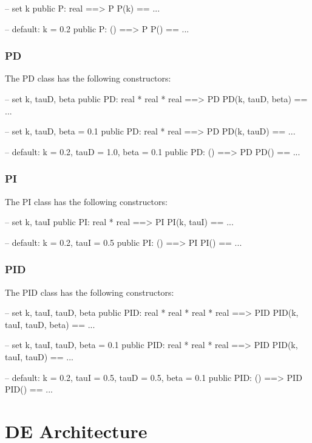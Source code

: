 \documentclass{crescendorepchap}
\begin{document}
\begin{vdmrt}
-- set k
public P: real ==> P
P(k) == ...

-- default: k = 0.2
public P: () ==> P
P() == ...
\end{vdmrt}

\subsubsection{PD}

The PD class has the following constructors:

\begin{vdmrt}
-- set k, tauD, beta
public PD: real * real * real ==> PD
PD(k, tauD, beta) == ...

-- set k, tauD, beta = 0.1
public PD: real * real ==> PD
PD(k, tauD) == ...

-- default: k = 0.2, tauD = 1.0, beta = 0.1
public PD: () ==> PD
PD() == ...
\end{vdmrt}

\subsubsection{PI}

The PI class has the following constructors:

\begin{vdmrt}
-- set k, tauI
public PI: real * real ==> PI
PI(k, tauI) == ...

-- default: k = 0.2, tauI = 0.5
public PI: () ==> PI
PI() == ...
\end{vdmrt}

\subsubsection{PID}

The PID class has the following constructors:

\begin{vdmrt}
-- set k, tauI, tauD, beta
public PID: real * real * real * real ==> PID
PID(k, tauI, tauD, beta) == ...

-- set k, tauI, tauD, beta = 0.1
public PID: real * real * real ==> PID
PID(k, tauI, tauD) == ...

-- default: k = 0.2, tauI = 0.5, tauD = 0.5, beta = 0.1
public PID: () ==> PID
PID() == ...
\end{vdmrt}


\section{DE Architecture}\label{sec:DEArch}
\end{document}
